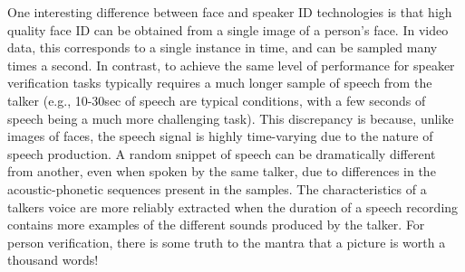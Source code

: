 \documentclass{article}
\begin{document}
One interesting difference between face and speaker ID technologies is that high quality face ID can be obtained from a single image of a person's face.  In video data, this corresponds to a single instance in time, and can be sampled many times a second.  In contrast, to achieve the same level of performance for speaker verification tasks typically requires a much longer sample of speech from the talker (e.g., 10-30sec of speech are typical conditions, with a few seconds of speech being a much more challenging task).  This discrepancy is because, unlike images of faces, the speech signal is highly time-varying due to the nature of speech production.  A random snippet of speech can be dramatically different from another, even when spoken by the same talker, due to differences in the acoustic-phonetic sequences present in the samples.  The characteristics of a talkers voice are more reliably extracted when the duration of a speech recording contains more examples of the different sounds produced by the talker.  For person verification, there is some truth to the mantra that a picture is worth a thousand words!
\end{document}
